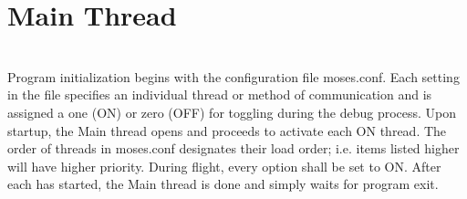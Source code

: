%
\section{Main Thread}
\hrulefill
\\
Program initialization begins with the configuration file moses.conf. Each setting in the file specifies an individual thread or method of communication and is assigned a one (ON) or zero (OFF) for toggling during the debug process. Upon startup, the Main thread opens and proceeds to activate each ON thread. The order of threads in moses.conf designates their load order; i.e. items listed higher will have higher priority. During flight, every option shall be set to ON. After each has started, the Main thread is done and simply waits for program exit. 